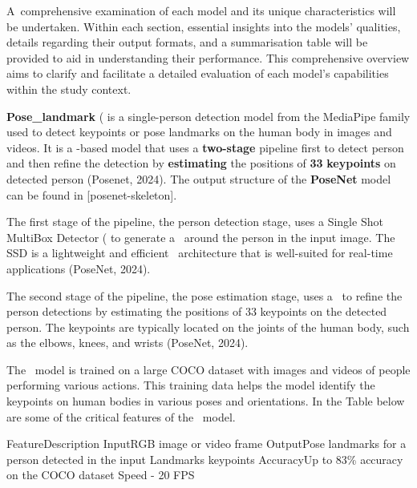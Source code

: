 A~comprehensive examination of each model and its unique characteristics will be undertaken. Within each section, essential insights into the models' qualities, details regarding their output formats, and a summarisation table will be provided to aid in understanding their performance. This comprehensive overview aims to clarify and facilitate a detailed evaluation of each model's capabilities within the study context.

{\bf Pose_landmark} (\PoseNet\) is a single-person detection model from the MediaPipe family used to detect keypoints or pose landmarks on the human body in images and videos. It is a \CNN\--based model that uses a {\bf two-stage} pipeline first to detect person {\bf \BBOX} and then refine the detection by {\bf estimating} the positions of {\bf 33} {\bf keypoints} on detected person (\scc Posenet, 2024). The output structure of the {\bf PoseNet} model can be found in [posenet-skeleton].

The first stage of the pipeline, the person detection stage, uses a Single Shot MultiBox Detector (\SSD\) to generate a \BBOX\ around the person in the input image. The SSD is a lightweight and efficient \CNN\ architecture that is well-suited for real-time applications (\scc PoseNet, 2024).

The second stage of the pipeline, the pose estimation stage, uses a \CNN\ to refine the person detections by estimating the positions of 33 keypoints on the detected person. The keypoints are typically located on the joints of the human body, such as the elbows, knees, and wrists (\scc PoseNet, 2024).

The \PoseNet\ model is trained on a large COCO dataset with images and videos of people performing various actions. This training data helps the model identify the keypoints on human bodies in various poses and orientations. In the Table below are some of the critical features of the \PoseNet\ model.

 \setupTABLE[r][1][style=bold]
 \setupTABLE[c][each][offset=3dd]
 \setupTABLE[frame=off]
 \setupTABLE[r][1][topframe=on,bottomframe=on]
 \setupTABLE[c][each][leftframe=on]
 \setupTABLE[c][1][leftframe=off]
 \bTR
 \bTD Feature\eTD\bTD Description\eTD\eTR
 \bTR
 \bTD Input\eTD\bTD RGB image or video frame\eTD\eTR
 \bTR
 \bTD Output\eTD\bTD Pose landmarks for a person detected in the input\eTD\eTR
 \bTR
 \bTD Landmarks\eTD{} keypoints\eTD\eTR
 \bTR
 \bTD Accuracy\eTD\bTD Up to 83\% accuracy on the COCO dataset\eTD\eTR
 \bTR
 \bTD Speed\eTD{} - 20 FPS\eTD\eTR

